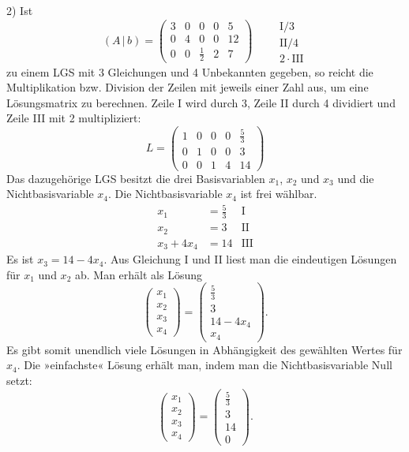 2) Ist
\[ (A\,|\,b) = \left(\begin{array}{cccc|c} 3 & 0 & 0 & 0 & 5\\ 0 & 4 & 0 & 0 & 12\\ 0 & 0 & \frac{1}{2} & 2 & 7 \end{array}\right) \qquad \begin{array}{l} \text{I}/3\\ \text{II}/4\\ 2\cdot\text{III} \end{array} \]
zu einem LGS mit 3 Gleichungen und 4 Unbekannten gegeben, so reicht die Multiplikation bzw. Division der Zeilen mit jeweils einer Zahl aus, um eine Lösungsmatrix zu berechnen.
Zeile I wird durch 3, Zeile II durch 4 dividiert und Zeile III mit 2 multipliziert:
\[ L = \left(\begin{array}{cccc|c} 1 & 0 & 0 & 0 & \frac{5}{3}\\ 0 & 1 & 0 & 0 & 3\\ 0 & 0 & 1 & 4 & 14 \end{array}\right) \]
Das dazugehörige LGS besitzt die drei Basisvariablen $x_1$, $x_2$ und $x_3$ und die Nichtbasisvariable $x_4$. Die Nichtbasisvariable $x_4$ ist frei wählbar.
\begin{align*}
  x_1 &= \tfrac{5}{3} & \text{I}\\
  x_2 &= 3 & \text{II}\\
  x_3 + 4x_4 &= 14 & \text{III}
\end{align*}
Es ist $x_3 = 14 - 4x_4$. Aus Gleichung I und II liest man die eindeutigen Lösungen für $x_1$ und $x_2$ ab. Man erhält als Lösung
\[ \begin{pmatrix} x_1 \\ x_2 \\ x_3 \\ x_4 \end{pmatrix} = \begin{pmatrix} \frac{5}{3} \\ 3 \\ 14 - 4x_4 \\ x_4 \end{pmatrix} . \]
Es gibt somit unendlich viele Lösungen in Abhängigkeit des gewählten Wertes für $x_4$. Die »einfachste« Lösung erhält man, indem man die Nichtbasisvariable Null setzt:
\[ \begin{pmatrix} x_1 \\ x_2 \\ x_3 \\ x_4 \end{pmatrix} = \begin{pmatrix} \frac{5}{3} \\ 3 \\ 14 \\ 0 \end{pmatrix} . \]
